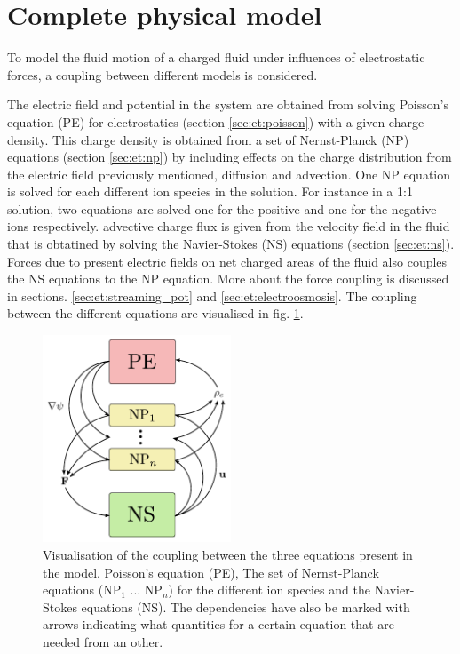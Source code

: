 \section{Complete physical model}\label{sec:et:coupling}
To model the fluid motion of a charged fluid under influences of
electrostatic forces, a coupling between different models is
considered.

The electric field and potential in the system are obtained from
solving Poisson's equation (PE) for electrostatics (section
\ref{sec:et:poisson}) with a given charge density. This charge density
is obtained from a set of Nernst-Planck (NP) equations (section
\ref{sec:et:np}) by including effects on the charge distribution from
the electric field previously mentioned, diffusion and advection. One
NP equation is solved for each different ion species in the
solution. For instance in a 1:1 solution, two equations are solved one
for the positive and one for the negative ions respectively.
advective charge flux is given from the velocity field in the fluid
that is obtatined by solving the Navier-Stokes (NS) equations (section
\ref{sec:et:ns}). Forces due to present electric fields on net charged
areas of the fluid also couples the NS equations to the NP
equation. More about the force coupling is discussed in
sections. \ref{sec:et:streaming_pot} and
\ref{sec:et:electroosmosis}. The coupling between the different
equations are visualised in fig. \ref{fig:coupling}.


\begin{figure}
\begin{center}
\includegraphics[width=0.5\textwidth]{fig/coupling.pdf}
\end{center}
\caption{Visualisation of the coupling between the three equations
  present in the model. Poisson's equation (PE), The set of
  Nernst-Planck equations (NP$_1$ ... NP$_n$) for the different ion
  species and the Navier-Stokes equations (NS). The dependencies have
  also be marked with arrows indicating what quantities for a certain
  equation that are needed from an other.}
\label{fig:coupling}
\end{figure}



